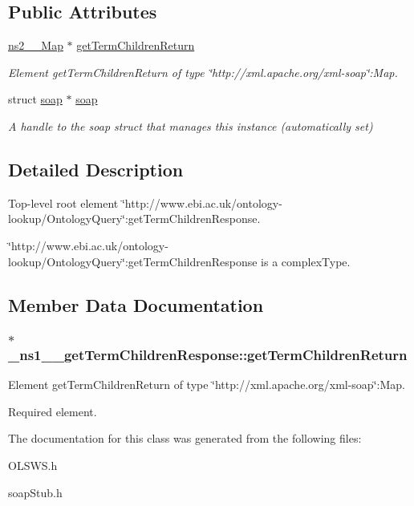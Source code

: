 \subsection*{Public Attributes}
\begin{DoxyCompactItemize}
\item 
\hyperlink{classns2____Map}{ns2\_\-\_\-Map} $\ast$ \hyperlink{class__ns1____getTermChildrenResponse_a2d44a06cc1e08286289b8004794d3a11}{getTermChildrenReturn}
\begin{DoxyCompactList}\small\item\em Element getTermChildrenReturn of type \char`\"{}http://xml.apache.org/xml-\/soap\char`\"{}:Map. \end{DoxyCompactList}\item 
\hypertarget{class__ns1____getTermChildrenResponse_aea6cbc5050e6607e21ab9769674a5cfe}{
struct \hyperlink{class__ns1____getTermChildrenResponse_aea6cbc5050e6607e21ab9769674a5cfe}{soap} $\ast$ \hyperlink{class__ns1____getTermChildrenResponse_aea6cbc5050e6607e21ab9769674a5cfe}{soap}}
\label{class__ns1____getTermChildrenResponse_aea6cbc5050e6607e21ab9769674a5cfe}

\begin{DoxyCompactList}\small\item\em A handle to the soap struct that manages this instance (automatically set) \end{DoxyCompactList}\end{DoxyCompactItemize}


\subsection{Detailed Description}
Top-\/level root element \char`\"{}http://www.ebi.ac.uk/ontology-\/lookup/OntologyQuery\char`\"{}:getTermChildrenResponse. 

\char`\"{}http://www.ebi.ac.uk/ontology-\/lookup/OntologyQuery\char`\"{}:getTermChildrenResponse is a complexType. 

\subsection{Member Data Documentation}
\hypertarget{class__ns1____getTermChildrenResponse_a2d44a06cc1e08286289b8004794d3a11}{
\subsubsection[{getTermChildrenReturn}]{ $\ast$ {\bf \_\-ns1\_\-\_\-getTermChildrenResponse::getTermChildrenReturn}}}
\label{class__ns1____getTermChildrenResponse_a2d44a06cc1e08286289b8004794d3a11}


Element getTermChildrenReturn of type \char`\"{}http://xml.apache.org/xml-\/soap\char`\"{}:Map. 

Required element. 

The documentation for this class was generated from the following files:\begin{DoxyCompactItemize}
\item 
OLSWS.h\item 
soapStub.h\end{DoxyCompactItemize}
